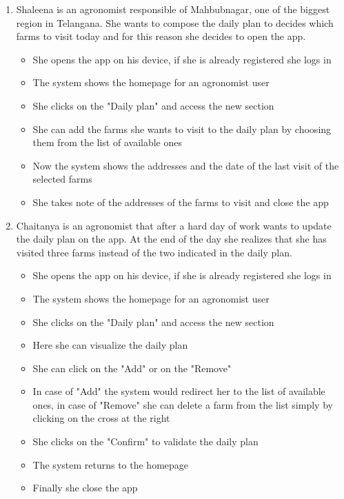 \documentclass[table, 12pt]{article}
\begin{document}
\begin{enumerate}
    \item Shaleena is an agronomist responsible of Mahbubnagar, one of the biggest region in Telangana.
    She wants to compose the daily plan to decides which farms to visit today and for this reason she decides to open the app.
    \begin{itemize}
        \item She opens the app on his device, if she is already registered she logs in
        \item The system shows the homepage for an agronomist user
        \item She clicks on the "Daily plan" and access the new section
        \item She can add the farms she wants to visit to the daily plan by choosing them from the list of available ones
        \item Now the system shows the addresses and the date of the last visit of the selected farms
        \item She takes note of the addresses of the farms to visit and close the app
    \end{itemize}
    \item Chaitanya is an agronomist that after a hard day of work wants to update the daily plan on the app.
    At the end of the day she realizes that she has visited three farms instead of the two indicated in the daily plan.
    \begin{itemize}
        \item She opens the app on his device, if she is already registered she logs in
        \item The system shows the homepage for an agronomist user
        \item She clicks on the "Daily plan" and access the new section
        \item Here she can visualize the daily plan
        \item She can click on the "Add" or on the "Remove"
        \item In case of "Add" the system would redirect her to the list of available ones, in case of "Remove" she can delete a farm 
        from the list simply by clicking on the cross at the right
        \item She clicks on the "Confirm" to validate the daily plan
        \item The system returns to the homepage
        \item Finally she close the app
    \end{itemize}
    

\end{enumerate}
\end{document}
